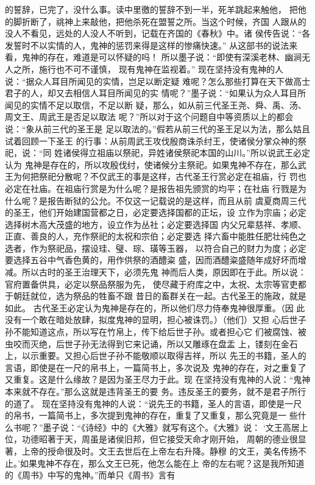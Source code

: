 \documentclass[12pt,UTF8]{ctexbook}
\begin{document}
的誓辞，已完了，没什么事。读中里徼的誓辞不到一半，死羊跳起来触他， 
把他的脚折断了，祧神上来敲他，把他杀死在盟誓之所。当这个时候，齐国 
人跟从的没人不看见，远处的人没人不听到，记载在齐国的《春秋》中。诸 
侯传告说：“各发誓时不以实情的人，鬼神的惩罚来得是这样的惨痛快速。” 
从这部书的说法来看，鬼神的存在，难道是可以怀疑的吗！ 
所以墨子说：“即使有深溪老林、幽涧无人之所，施行也不可不谨慎， 
现有鬼神在监视着。” 
现在坚持没有鬼神的人说：“据众人耳目所闻见的实情，岂足以断定疑 
难呢？怎么那些打算在天下做高士君子的人，却又去相信人耳目所闻见的实 
情呢？”墨子说：“如果认为众人耳目所闻见的实情不足以取信，不足以断 
疑，那么，如从前三代圣王尧、舜、禹、汤、周文王、周武王是否足以取法 
呢？”所以对于这个问题自中等资质以上的都会说：“象从前三代的圣王是 
足以取法的。”假若从前三代的圣王足以为法，那么姑且试着回顾一下圣王 
的行事：从前周武王攻伐殷商诛杀纣王，使诸侯分掌众神的祭祀，说：“同 
姓诸侯得立祖庙以祭祀，异姓诸侯祭祀本国的山川。”所以说武王必定认为 
鬼神是存在的，所以攻殷伐纣，使诸候分主祭祀。如果鬼神不存在，那么武 
王为何把祭祀分散呢？不仅武王的事是这样，古代圣王行赏必定在祖庙，行 
罚也必定在社庙。在祖庙行赏是为什么呢？是报告祖先颁赏的均平；在社庙 
行戮是为什么呢？是报告断狱的公允。不仅这一记载说的是这样，而且从前 
虞夏商周三代的圣王，他们开始建国营都之日，必定要选择国都的正坛，设 
立作为宗庙；必定选择树木高大茂盛的地方，设立作为丛社；必定要选择国 
内父兄辈慈祥、孝顺、正直、善良的人，充作祭祀的太祝和宗伯；必定要选 
择六畜中能胜任肥壮纯色之选者，作为祭祀品，摆设珪、璧、琮、璜等玉器， 
以符合自己的财力为度；必定要选择五谷中气香色黄的，用作供祭的酒醴粢 
盛，因而酒醴粢盛随年成好坏而增减。所以古时的圣王治理天下，必须先鬼 
神而后人类，原因即在于此。所以说：官府置备供具，必定以祭品祭服为先， 
使尽藏于府库之中，太祝、太宗等官吏都于朝廷就位，选为祭品的牲畜不跟 
昔日的畜群关在一起。古代圣王的施政，就是如此。 
古代圣王必定认为鬼神是存在的，所以他们尽力侍奉鬼神很厚重。（因 
此没有一个敢在暗处放肆，拟度鬼神的显明，担心被诛罚。）（他们）又担 
心后世子孙不能知道这点，所以写在竹帛上，传下给后世子孙。或者担心它 
们被腐蚀、被虫咬而灭绝，后世子孙无法得到它来记诵，所以又雕琢在盘盂 
上，镂刻在金石上，以示重要。又担心后世子孙不能敬顺以取得吉祥，所以 
先王的书籍，圣人的言语，即使是在一尺的帛书上，一篇简书上，多次说及 
鬼神的存在，对之重复了又重复。这是什么缘故？是因为圣王尽力于此。现 
在坚持没有鬼神的人说：“鬼神本来就不存在。”那么这就是违背圣王的要 
务。违反圣王的要务，就不是君子所行的道了。 
现在坚持没有鬼神的人说：“说先王的书籍，圣人的言语，即使是一尺 
的帛书，一篇简书上，多次提到鬼神的存在，重复了又重复，那么究竟是一 
些什么书呢？”墨子说：“《诗经》中的《大雅》就写有这个。《大雅》说： 
‘文王高居上位，功德昭著于天，周虽是诸侯旧邦，但它接受天命才刚开始， 
周朝的德业很显著，上帝的授命很及时。文王去世后在上帝左右升降。静穆 
的文王，美名传扬不止。’如果鬼神不存在，那么文王已死，他怎么能在上 
帝的左右呢？这是我所知道的《周书》中写的鬼神。”而单只《周书》言有 
\end{document}

